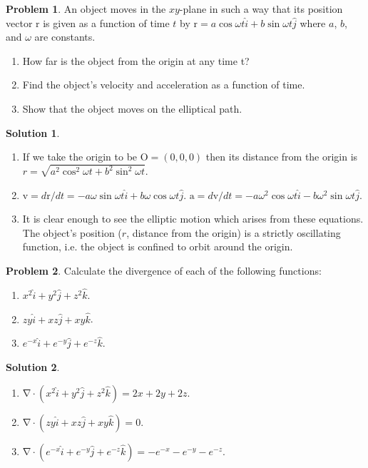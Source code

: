 \documentclass[10pt]{article}
\theoremstyle{definition}
\newtheorem{problem}{Problem}
\newtheorem{soln}{Solution}
\newcommand{\ui}{\hat{i}}
\newcommand{\uj}{\hat{j}}
\newcommand{\uk}{\hat{k}}
\newcommand{\bv}[1]{\bm{\mathrm{#1}}}
\begin{document}
\begin{problem}
An object moves in the $xy$-plane in such a way that its position vector $\bv{r}$ is given as a function
of time $t$ by $\bv{r}=a\cos \omega t \ui + b\sin\omega t\uj$ where $a$, $b$, and $\omega$ are constants.
\begin{enumerate}[label=(\alph*)]
  \item How far is the object from the origin at any time t?
  \item Find the object's velocity and acceleration as a function of time.
  \item Show that the object moves on the elliptical path.
\end{enumerate}
\end{problem}
\begin{soln}~
  \begin{enumerate}[label=(\alph*)]
    \item If we take the origin to be $\bv{O}=(0,0,0)$ then its distance from the origin is
          $r=\sqrt{a^2\cos^2 \omega t + b^2\sin^2\omega t}$.
    \item $\bv{v}=d\bv{r}/dt=-a\omega\sin \omega t \ui + b\omega\cos\omega t\uj$.
          $\bv{a}=d\bv{v}/dt=-a\omega^2\cos \omega t \ui - b\omega^2\sin\omega t\uj$.
    \item It is clear enough to see the elliptic motion which arises from these equations. The object's position ($r$, distance from the origin)
          is a strictly oscillating function, i.e. the object is confined to orbit around the origin.
  \end{enumerate}
\end{soln}

\begin{problem}
Calculate the divergence of each of the following functions:
\begin{enumerate}[label=(\alph*)]
  \item $x^2\ui+y^2\uj+z^2\uk$.
  \item $zy\ui+xz\uj+xy\uk$.
  \item $e^{-x}\ui+e^{-y}\uj+e^{-z}\uk$.
\end{enumerate}
\end{problem}
\begin{soln}~
  \begin{enumerate}[label=(\alph*)]
    \item $\bv{\nabla}\cdot(x^2\ui+y^2\uj+z^2\uk)=2x+2y+2z$.
    \item $\bv{\nabla}\cdot(zy\ui+xz\uj+xy\uk)=0$.
    \item $\bv{\nabla}\cdot(e^{-x}\ui+e^{-y}\uj+e^{-z}\uk)=-e^{-x}-e^{-y}-e^{-z}$.
  \end{enumerate}
\end{soln}
\end{document}
